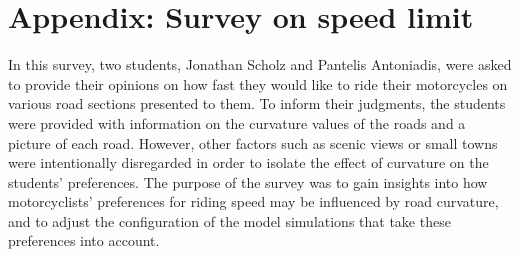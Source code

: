 \chapter{Appendix: Survey on speed limit}
\label{chapter:Appendix: Survey on speed limit}
In this survey, two students, Jonathan Scholz and Pantelis Antoniadis, were asked to provide their opinions on how fast they would like to ride their motorcycles on various road sections presented to them. To inform their judgments, the students were provided with information on the curvature values of the roads and a picture of each road. However, other factors such as scenic views or small towns were intentionally disregarded in order to isolate the effect of curvature on the students' preferences. The purpose of the survey was to gain insights into how motorcyclists' preferences for riding speed may be influenced by road curvature, and to adjust the configuration of the model simulations that take these preferences into account.

%